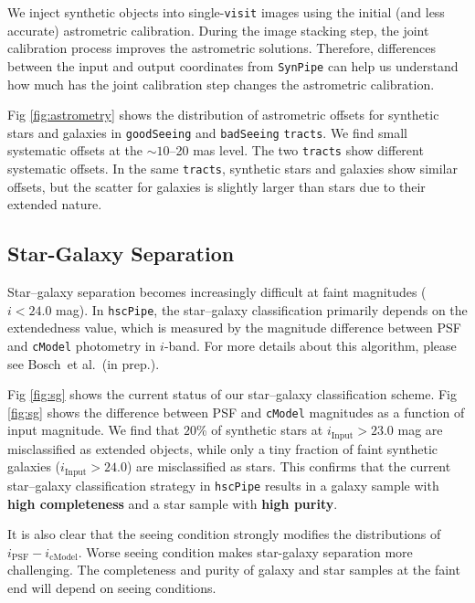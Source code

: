 \documentclass[useamsfonts]{pasj01}
\def\etal{{\ et al.~}}
\def\hscpipe{\texttt{hscPipe}}
\def\synpipe{\texttt{SynPipe}}
\def\cmodel{\texttt{cModel}}
\def\visit{\texttt{visit}}
\def\tracts{\texttt{tracts}}
\begin{document}
    We inject synthetic objects into single-\visit{} images using the initial (and 
    less accurate) astrometric calibration.
    During the image stacking step, the joint calibration process improves the
    astrometric solutions.
    Therefore, differences between the input and output coordinates from \synpipe{}
    can help us understand how much has the joint calibration step changes the 
    astrometric calibration.

    Fig \ref{fig:astrometry} shows the distribution of astrometric offsets for 
    synthetic stars and galaxies in \texttt{goodSeeing} and \texttt{badSeeing} 
    \tracts{}.
    We find small systematic offsets at the ${\sim}10$--20 mas level.
    The two \tracts{} show different systematic offsets.
    In the same \tracts{}, synthetic stars and galaxies show similar offsets, but 
    the scatter for galaxies is slightly larger than stars due to their extended 
    nature. 
    
\subsection{Star-Galaxy Separation}
    \label{ssec:sg}

    Star--galaxy separation becomes increasingly difficult at faint magnitudes 
    ($i<24.0$ mag).
    In \hscpipe{}, the star--galaxy classification primarily depends on the 
    extendedness value, which is measured by the magnitude difference between PSF and 
    \cmodel{} photometry in $i$-band.
    For more details about this algorithm, please see Bosch\etal (in prep.).

    Fig \ref{fig:sg} shows the current status of our star--galaxy classification 
    scheme.  
    Fig \ref{fig:sg} shows the difference between PSF and \cmodel{} magnitudes as a 
    function of input magnitude. 
    We find that $20$\% of synthetic stars at $i_{\mathrm{Input}}>23.0$ mag are 
    misclassified as extended objects, while only a tiny fraction of faint synthetic 
    galaxies ($i_{\mathrm{Input}}>24.0$) are misclassified as stars. 
    This confirms that the current star--galaxy classification strategy in \hscpipe{}
    results in a galaxy sample with \textbf{high completeness} and a star sample
    with \textbf{high purity}.

    It is also clear that the seeing condition strongly modifies the distributions
    of $i_{\mathrm{PSF}}-i_{\mathrm{cModel}}$. 
    Worse seeing condition makes star-galaxy separation more challenging. 
    The completeness and purity of galaxy and star samples at the faint end will 
    depend on seeing conditions.  
\end{document}
